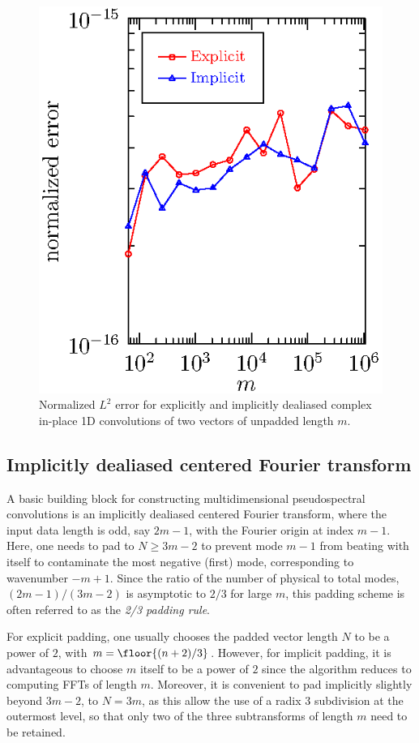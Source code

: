 \documentclass[final]{siamltex}
\begin{document}
\begin{figure}[htbp]
\begin{minipage}{0.49\linewidth}
\begin{center}
\includegraphics{error1c}
\caption{Normalized $L^2$ error for explicitly and implicitly
dealiased complex in-place 1D convolutions of two vectors of
unpadded length $m$.}
\label{error1c}
\end{center}
\end{minipage}
\end{figure}

\subsection{Implicitly dealiased centered Fourier transform}\label{fft0}
A basic building block for constructing multidimensional pseudospectral
convolutions is an implicitly dealiased centered Fourier transform, where the
input data length is odd, say $2m-1$, with the Fourier origin at index $m-1$. 
Here, one needs to pad to $N\ge 3m-2$ to prevent 
mode $m-1$ from beating with itself to contaminate the most negative
(first) mode, corresponding to wavenumber $-m+1$. Since the ratio of the
number of physical to total modes, $(2m-1)/(3m-2)$ is asymptotic to $2/3$
for large $m$, this padding scheme is often referred to as the {\it 2/3
padding rule}.

For explicit padding, one usually chooses the padded vector length
$N$ to be a power of $2$, with $m=\floor{(n+2)/3}$.
However, for implicit
padding, it is advantageous to choose $m$ itself to be a power of $2$
since the algorithm reduces to computing FFTs of length $m$.
Moreover, it is convenient to pad implicitly slightly beyond $3m-2$, to $N=3m$,
as this allow the use of a radix $3$ subdivision at the outermost level, so
that only two of the three subtransforms of length $m$ need to be retained. 
\end{document}
